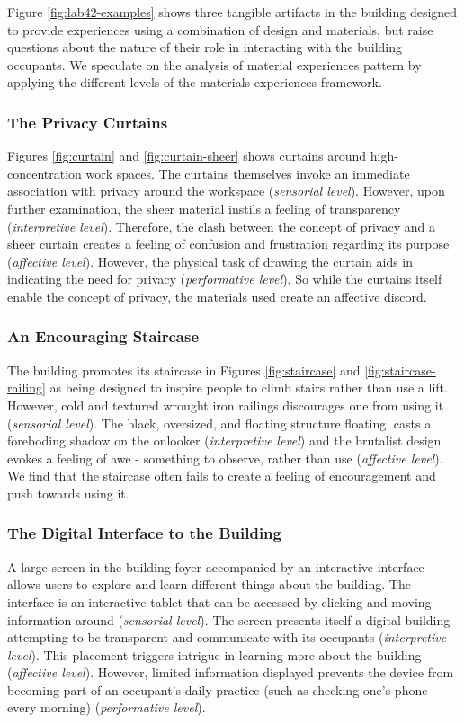 \documentclass[manuscript, anonymous, review]{acmart}
\begin{document}
Figure \ref{fig:lab42-examples} shows three tangible artifacts in the building designed to provide experiences using a combination of design and materials, but raise questions about the nature of their role in interacting with the building occupants. We speculate on the analysis of material experiences pattern by applying the different levels of the materials experiences framework.

\subsubsection*{The Privacy Curtains}
Figures \ref{fig:curtain} and \ref{fig:curtain-sheer} shows curtains around high-concentration work spaces. The curtains themselves invoke an immediate association with privacy around the workspace (\textit{sensorial level}). However, upon further examination, the sheer material instils a feeling of transparency (\textit{interpretive level}). Therefore, the clash between the concept of privacy and a sheer curtain creates a feeling of confusion and frustration regarding its purpose (\textit{affective level}). However, the physical task of drawing the curtain aids in indicating the need for privacy (\textit{performative level}). So while the curtains itself enable the concept of privacy, the materials used  create an affective discord. 

\subsubsection*{An Encouraging Staircase}
The building promotes its staircase in Figures \ref{fig:staircase} and \ref{fig:staircase-railing} as being designed to inspire people to climb stairs rather than use a lift. However, cold and textured wrought iron railings discourages one from using it (\textit{sensorial level}). The black, oversized, and floating structure floating, casts a foreboding  shadow on the onlooker  (\textit{interpretive level}) and the brutalist design evokes a feeling of awe - something to observe, rather than use (\textit{affective level}). We find that the staircase often fails to create a feeling of encouragement and push towards using it.

\subsubsection*{The Digital Interface to the Building}
A large screen in the building foyer accompanied by an interactive interface allows users to explore and learn different things about the building. The interface is an interactive tablet that can be accessed by clicking and moving information around (\textit{sensorial level}). The screen presents itself a digital building attempting to be transparent and communicate with its occupants (\textit{interpretive level}). This placement triggers intrigue in learning more about the building (\textit{affective level}). However, limited information displayed prevents the device from becoming part of an occupant's daily practice (such as checking one's phone every morning) (\textit{performative level}). 
\end{document}
